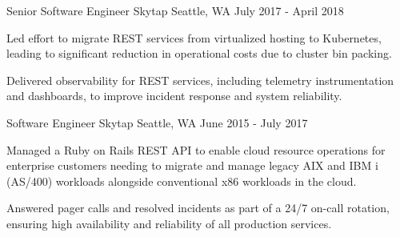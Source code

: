\begin{cventries}
  \cventry
    {Senior Software Engineer} %
    {Skytap} %
    {Seattle, WA} %
    {July 2017 - April 2018} %
    {
      \begin{cvitems} %
        \item {Led effort to migrate REST services from virtualized hosting to Kubernetes, leading to significant reduction in operational costs due to cluster bin packing.}
        \item {Delivered observability for REST services, including telemetry instrumentation and dashboards, to improve incident response and system reliability.}
      \end{cvitems}
    }

  \cventry
    {Software Engineer} %
    {Skytap} %
    {Seattle, WA} %
    {June 2015 - July 2017} %
    {
      \begin{cvitems} %
        \item {Managed a Ruby on Rails REST API to enable cloud resource operations for enterprise customers needing to migrate and manage legacy AIX and IBM i (AS/400) workloads alongside conventional x86 workloads in the cloud.}
        \item {Answered pager calls and resolved incidents as part of a 24/7 on-call rotation, ensuring high availability and reliability of all production services.}
      \end{cvitems}
    }

\end{cventries}

